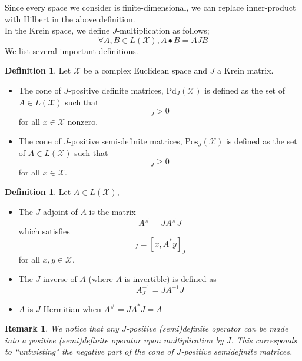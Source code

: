 \documentclass{amsart}
\numberwithin{equation}{section}
\newtheorem{remark}[theorem]{Remark}
\theoremstyle{definition}
\newtheorem{definition}[theorem]{Definition}
\theoremstyle{plain}
\theoremstyle{solutionstyle}
\begin{document}
Since every space we consider is finite-dimensional, we can replace inner-product with Hilbert in the above definition.\\
In the Krein space, we define $J$-multiplication as follows; \begin{equation*}\forall A,B\in L(\mathcal{X}), A\bullet B=AJB\end{equation*} 
We list several important definitions. 
\begin{definition}\cite{franco2026conejhermitianmatricesgeometric} Let $\mathcal{X}$ be a complex Euclidean space and $J$ a Krein matrix. 
\begin{itemize}
        \item The cone of $J$-positive definite matrices, $\mathrm{Pd}_J(\mathcal{X})$ is defined as the set of $A\in L(\mathcal{X})$ such that 
        \begin{equation*}[Ax,x]_J>0\end{equation*} for all $x\in \mathcal{X}$ nonzero. 
          \item The cone of $J$-positive semi-definite matrices, $\mathrm{Pos}_J(\mathcal{X})$ is defined as the set of $A\in L(\mathcal{X})$ such that 
        \begin{equation*}[Ax,x]_J\geq 0\end{equation*} for all $x\in \mathcal{X}$. 
    \end{itemize}
\end{definition}
\begin{definition}\cite{franco2026conejhermitianmatricesgeometric}
 Let  $A\in L(\mathcal{X})$, 
  \begin{itemize}
  \item The $J$-adjoint of $A$ is the matrix \begin{equation*}A^\#=JA^\#J\end{equation*} which satisfies 
    \begin{equation*}[Ax,y]_J=[x,A^*y]_J\end{equation*} for all $x,y\in \mathcal{X}$.
    \item The $J$-inverse of $A$ (where $A$ is invertible) is defined as 
    \begin{equation*}A_J^{-1}=JA^{-1}J\end{equation*}
    \item $A$ is $J$-Hermitian when $A^\#=JA^*J=A$
    \end{itemize}
\end{definition}
\begin{remark}We notice that any $J$-positive (semi)definite operator can be made into a positive (semi)definite operator upon multiplication by $J$. This corresponds to 
``untwisting" the negative part of the cone of $J$-positive semidefinite matrices. \end{remark}
\end{document}
